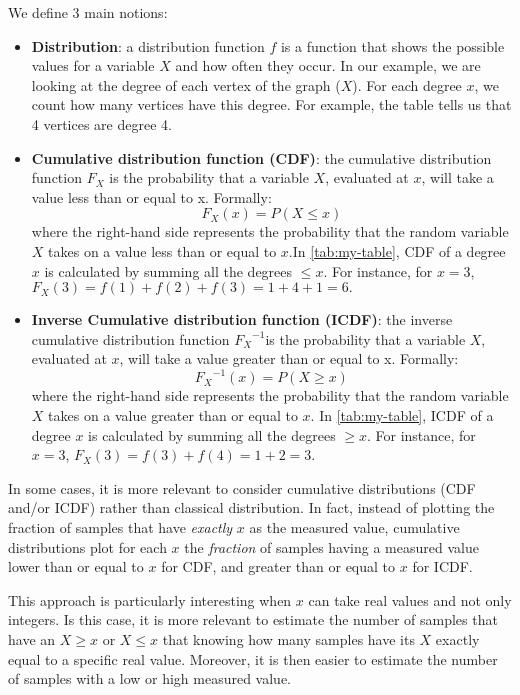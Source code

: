 \documentclass[table]{report}
\begin{document}
\noindent
We define 3 main notions:
\begin{itemize}[noitemsep]
    \item \textbf{Distribution}: a distribution function $f$ is a function that shows the possible values for a variable $X$ and how often they occur. In our example, we are looking at the degree of each vertex of the graph ($X$). For each degree $x$, we count how many vertices have this degree. For example, the table tells us that 4 vertices are degree 4.
    \item \textbf{Cumulative distribution function (CDF)}: the cumulative distribution function $F_X$ is the probability that a variable $X$, evaluated at $x$, will take a value less than or equal to x. Formally:
$$F_X(x) = P(X \leq x)$$ 
where the right-hand side represents the probability that the random variable $X$ takes on a value less than or equal to $x$.In \ref{tab:my-table}, CDF of a degree $x$ is calculated by summing all the degrees $\leq x$. For instance, for $x=3$, $F_X(3) = f(1)+f(2)+f(3)=1+4+1=6. $


    \item \textbf{Inverse Cumulative distribution function (ICDF)}: the inverse cumulative distribution function ${F_X}^{-1}$is the probability that a variable $X$, evaluated at $x$, will take a value greater than or equal to x. Formally:
$${F_X}^{-1}(x) = P(X \geq x)$$ 
where the right-hand side represents the probability that the random variable $X$ takes on a value greater than or equal to $x$. In \ref{tab:my-table}, ICDF of a degree $x$ is calculated by summing all the degrees $\geq x$. For instance, for $x=3$, $F_X(3) = f(3)+f(4)=1+2=3.$
\end{itemize}

\bigbreak
In some cases, it is more relevant to consider cumulative distributions (CDF and/or ICDF) rather than classical  distribution. In fact, instead of plotting the fraction of samples that have \textit{exactly} $x$ as the measured value, cumulative distributions plot for each $x$ the \textit{fraction} of samples having a measured value lower than or equal to $x$ for CDF, and greater than or equal to $x$ for ICDF. 

\medbreak
This approach is particularly interesting when $x$ can take real values and not only integers. Is this case, it is more relevant to estimate the number of samples that have an  $X \geq x$ or $X \leq x$ that knowing how many samples have its $X$ exactly equal to a specific real value. Moreover, it is then easier to estimate the number of samples with a low or high measured value.\cite{latapy}
\end{document}
